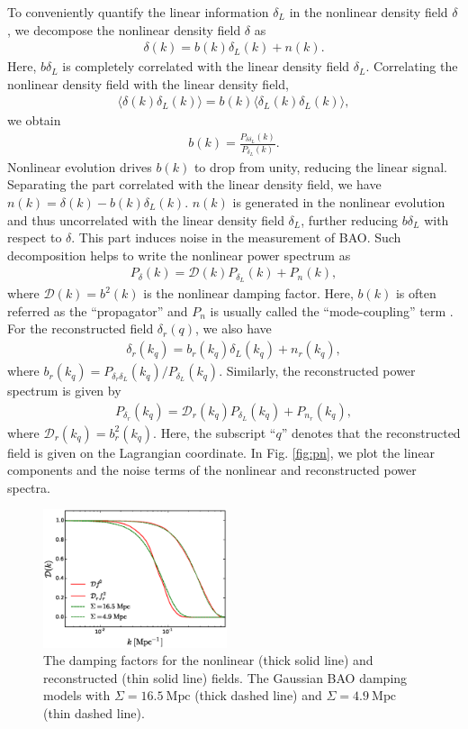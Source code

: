 \documentclass[aps,prd,twocolumn,showpacs,superscriptaddress,groupedaddress,nofootinbib]{revtex4}  %
\newcommand{\mr}{\mathrm}
\newcommand{\bea}{\begin{eqnarray}}
\newcommand{\eea}{\end{eqnarray}}
\begin{document}
To conveniently quantify the linear information $\delta_L$ in 
the nonlinear density field $\delta$, we decompose the nonlinear density field
$\delta$ as
\begin{eqnarray}
\delta({k})=b({k})\delta_L({k})+n({k}).
\end{eqnarray}
Here, $b\delta_L$ is completely correlated with the linear density field 
$\delta_L$. Correlating the nonlinear density field with the linear density 
field,  
\bea
\langle\delta(k)\delta_L(k)\rangle=b(k)\langle\delta_L(k)\delta_L(k)\rangle,
\eea
we obtain 
\bea
b(k)=\frac{P_{\delta\delta_L}(k)}{P_{\delta_L}(k)}.
\eea
Nonlinear evolution drives $b(k)$ to drop from unity, reducing the linear 
signal. Separating the part correlated with the linear density field, we have
$n(k)=\delta(k)-b(k)\delta_L(k)$.
$n(k)$ is generated in the nonlinear evolution and thus uncorrelated with
the linear density field $\delta_L$, further reducing $b\delta_L$ with respect
to $\delta$. This part induces noise in the measurement of BAO. 
Such decomposition helps to write the nonlinear power spectrum as
\bea
P_\delta(k)=\mathcal{D}(k)P_{\delta_L}(k)+P_{n}(k),
\eea
where $\mathcal{D}(k)=b^2(k)$ is the nonlinear damping factor.
Here, $b(k)$ is often referred as the ``propagator'' and $P_{n}$ is usually
called the ``mode-coupling'' term \cite{2006crocce,2008crocce,2008matsubara}.
For the reconstructed field $\delta_r(q)$, we also have
\bea
\delta_r(k_q)=b_r(k_q)\delta_L(k_q)+n_r(k_q),
\eea
where $b_r(k_q)={P_{\delta_r\delta_L}(k_q)}/{P_{\delta_L}(k_q)}$.
Similarly, the reconstructed power spectrum is given by
\bea
P_{\delta_r}(k_q)=\mathcal{D}_r(k_q)P_{\delta_L}(k_q)+P_{n_r}(k_q),
\eea
where $\mathcal{D}_r(k_q)=b^2_r(k_q)$.
Here, the subscript ``$q$'' denotes that the reconstructed field is given on the
Lagrangian coordinate.
In Fig. \ref{fig:pn}, we plot the linear components and the noise terms of
the nonlinear and reconstructed power spectra.

\begin{figure}[tbp]
\begin{center}
\includegraphics[width=0.48\textwidth]{f3.eps}
\end{center}
\vspace{-0.7cm}
\caption{The damping factors for the nonlinear (thick solid line) and 
reconstructed (thin solid line) fields. The Gaussian BAO damping models with 
$\Sigma=16.5\ \mr{Mpc}$ (thick dashed line) and $\Sigma=4.9\ \mr{Mpc}$ 
(thin dashed line).}
\label{fig:damp}
\end{figure}
\end{document}
